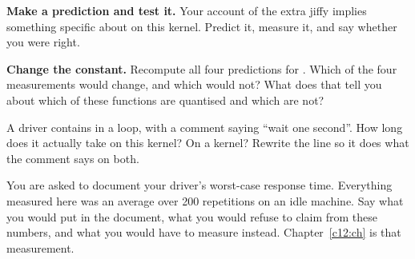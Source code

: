  \textbf{Make a prediction and test it.} Your account of the extra jiffy implies something
specific about  on this kernel. Predict it, measure it, and say whether you were
right.

 \textbf{Change the constant.} Recompute all four predictions for . Which of
the four measurements would change, and which would not? What does that tell you about which of
these functions are quantised and which are not?

 A driver contains  in a loop, with a comment
saying ``wait one second''. How long does it actually take on this kernel? On a 
kernel? Rewrite the line so it does what the comment says on both.

 You are asked to document your driver's worst-case response time. Everything measured here
was an average over 200 repetitions on an idle machine. Say what you would put in the document, what
you would refuse to claim from these numbers, and what you would have to measure instead.
Chapter~\ref{c12:ch} is that measurement.
